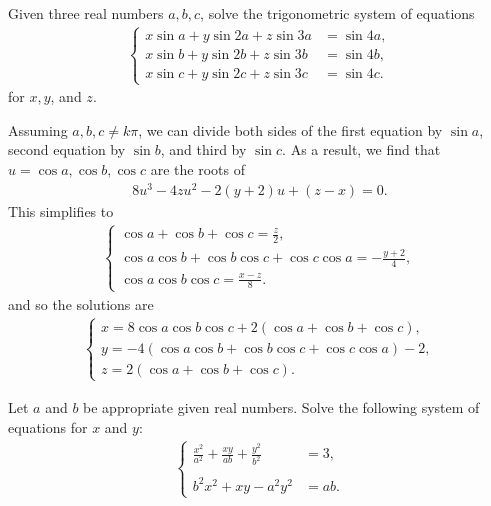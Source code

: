 \begin{question}\label{p:sys-eq-I}
    Given three real numbers $a,b,c$, solve the trigonometric system of equations
    \begin{align*}
        \begin{cases}
        x\sin a + y\sin 2a + z\sin 3a &= \sin 4a,\\ x\sin b + y\sin 2b + z\sin 3b &= \sin 4b,\\ x\sin c + y\sin 2c + z\sin 3c &= \sin 4c.
    \end{cases}
    \end{align*}
    for $x,y$, and $z$.
\end{question}

\begin{solution}
    Assuming $a,b,c \neq k\pi$, we can divide both sides of the first equation by $\sin a$, second equation by $\sin b$, and third by $\sin c$. As a result, we find that $u=\cos a,\cos b, \cos c$ are the roots of 
        \begin{align*}
            8u^3-4zu^2-2(y+2)u+(z-x)=0.
        \end{align*}
        This simplifies to
        \begin{align*}
            \begin{cases}
                \cos a + \cos b + \cos c =\displaystyle \frac{z}{2},\\ \cos a \cos b + \cos b  \cos c + \cos c \cos a = \displaystyle -\frac{y+2}{4},\\ \cos a \cos b \cos c = \displaystyle \frac{x-z}{8}.
            \end{cases} 
        \end{align*}
        and so the solutions are
        \begin{align*}
            \begin{cases}
                x= 8 \cos a \cos b \cos c + 2 (\cos a + \cos b + \cos c),\\ y=-4(\cos a \cos b + \cos b  \cos c + \cos c \cos a)-2,\\ z = 2 (\cos a + \cos b + \cos c).
            \end{cases}
        \end{align*}
\end{solution}


\begin{question}\label{p:sys-eq-J}
    Let $a$ and $b$ be appropriate given real numbers. Solve the following system of equations for $x$ and $y$:
    \begin{align*}
        \begin{cases}
        \displaystyle \frac{x^2}{a^2}+\frac{xy}{ab}+\frac{y^2}{b^2} &=3,\\ \\b^2x^2+xy-a^2y^2 &=ab.
    \end{cases}
    \end{align*}
\end{question}


